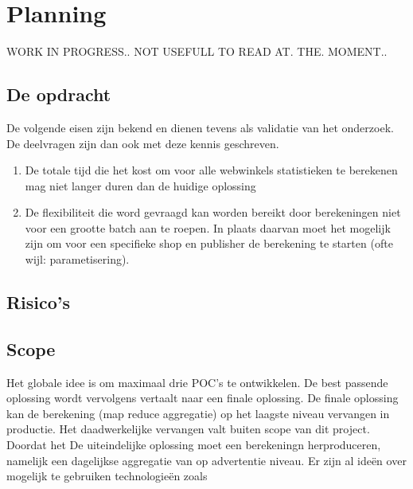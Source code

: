\chapter{Planning} %
WORK IN PROGRESS.. NOT USEFULL TO READ AT. THE. MOMENT..

\section{De opdracht} %

\noindent De volgende eisen zijn bekend en dienen tevens als validatie van het onderzoek. De deelvragen zijn dan ook met deze kennis geschreven.

\begin{enumerate}
\item De totale tijd die het kost om voor alle webwinkels statistieken te berekenen mag niet langer duren dan de huidige oplossing

\item De flexibiliteit die word gevraagd kan worden bereikt door berekeningen niet voor een grootte batch aan te roepen. In plaats daarvan moet het mogelijk zijn om voor een specifieke shop en publisher de berekening te starten (ofte wijl: parametisering).
\end{enumerate}

\section{Risico's}


\section{Scope}

Het globale idee is om maximaal drie POC's te ontwikkelen. De best passende oplossing wordt vervolgens vertaalt naar een finale oplossing.
De finale oplossing kan de berekening (map reduce aggregatie) op het laagste niveau vervangen in productie. 
Het daadwerkelijke vervangen valt buiten scope van dit project. 
Doordat het 
De uiteindelijke oplossing moet een berekeningn herproduceren, namelijk een dagelijkse aggregatie van op advertentie niveau. Er zijn al ideën over mogelijk te gebruiken technologieën zoals


